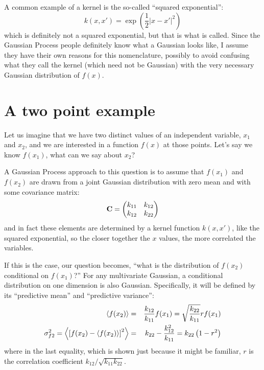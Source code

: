 A common example of a kernel is the so-called ``squared exponential'':
\begin{equation}
k(x, x') = \exp\left(\frac{1}{2}\left|x-x'\right|^2\right)
\end{equation}
which is definitely not a squared exponential, but that is what is
called. Since the Gaussian Process people definitely know what a
Gaussian looks like, I assume they have their own reasons for this
nomenclature, possibly to avoid confusing what they call the kernel
(which need not be Gaussian) with the very necessary Gaussian
distribution of $f(x)$.

\section{A two point example}

Let us imagine that we have two distinct values of an independent
variable, $x_1$ and $x_2$, and we are interested in a function $f(x)$
at those points. Let's say we know $f(x_1)$, what can we
say about $x_2$?

A Gaussian Process approach to this question is to assume that
$f(x_1)$ and $f(x_2)$ are drawn from a joint Gaussian distribution
with zero mean and with some covariance matrix:
\begin{equation}
{\bf C} = \left(\begin{matrix}
k_{11} & k_{12} \cr
k_{12} & k_{22} 
\end{matrix}\right)
\end{equation}
and in fact these elements are determined by a kernel function $k(x,
x')$, like the squared exponential, so the closer together the $x$
values, the more correlated the variables.

If this is the case, our question becomes, ``what is the distribution
of $f(x_2)$ conditional on $f(x_1)$?'' For any multivariate Gaussian,
a conditional distribution on one dimension is also
Gaussian. Specifically, it will be defined by its ``predictive mean''
and ``predictive variance'':
\begin{eqnarray}
 \left\langle f(x_2)\right\rangle &=& \frac{k_{12}}{k_{11}} f(x_1)
 = \sqrt{\frac{k_{22}}{k_{11}}}r f(x_1) \cr
\sigma_{f2}^2 = 
 \left\langle \left[f(x_2) - \left\langle
 f(x_2)\right\rangle\right]^2\right\rangle
 &=& {k_{22}} - \frac{k_{12}^2}{k_{11}} = k_{22} \left(1 - r^2\right)
\end{eqnarray}
where in the last equality, which is shown just because it might be
familiar, $r$ is the correlation coefficient $k_{12}
/ \sqrt{k_{11}k_{22}}$.

